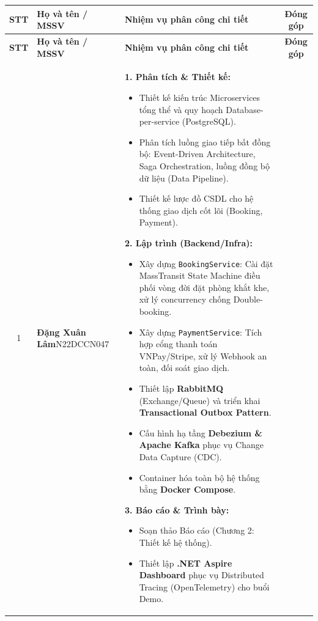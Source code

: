 \begin{longtable}{|c|p{3.2cm}|p{8.0cm}|c|}
  \hline
  \textbf{STT} & \textbf{Họ và tên / MSSV} & \textbf{Nhiệm vụ phân công chi tiết} & \textbf{Đóng góp} \\
  \hline
  \endfirsthead

  \hline
  \textbf{STT} & \textbf{Họ và tên / MSSV} & \textbf{Nhiệm vụ phân công chi tiết} & \textbf{Đóng góp} \\
  \hline
  \endhead

  \hline
  \endfoot

  1 & \textbf{Đặng Xuân Lâm}\newline N22DCCN047 & 
  \textbf{1. Phân tích \& Thiết kế:}
  \begin{itemize}[leftmargin=*, nosep, topsep=0pt]
      \item Thiết kế kiến trúc Microservices tổng thể và quy hoạch Database-per-service (PostgreSQL).
      \item Phân tích luồng giao tiếp bất đồng bộ: Event-Driven Architecture, Saga Orchestration, luồng đồng bộ dữ liệu (Data Pipeline).
      \item Thiết kế lược đồ CSDL cho hệ thống giao dịch cốt lõi (Booking, Payment).
  \end{itemize}
  \vspace{0.1cm}
  \textbf{2. Lập trình (Backend/Infra):}
  \begin{itemize}[leftmargin=*, nosep, topsep=0pt]
      \item Xây dựng \texttt{BookingService}: Cài đặt MassTransit State Machine điều phối vòng đời đặt phòng khắt khe, xử lý concurrency chống Double-booking.
      \item Xây dựng \texttt{PaymentService}: Tích hợp cổng thanh toán VNPay/Stripe, xử lý Webhook an toàn, đối soát giao dịch.
      \item Thiết lập \textbf{RabbitMQ} (Exchange/Queue) và triển khai \textbf{Transactional Outbox Pattern}.
      \item Cấu hình hạ tầng \textbf{Debezium \& Apache Kafka} phục vụ Change Data Capture (CDC).
      \item Container hóa toàn bộ hệ thống bằng \textbf{Docker Compose}.
  \end{itemize}
  \vspace{0.1cm}
  \textbf{3. Báo cáo \& Trình bày:}
  \begin{itemize}[leftmargin=*, nosep, topsep=0pt]
      \item Soạn thảo Báo cáo (Chương 2: Thiết kế hệ thống).
      \item Thiết lập \textbf{.NET Aspire Dashboard} phục vụ Distributed Tracing (OpenTelemetry) cho buổi Demo.

\end{itemize}
\end{longtable}
